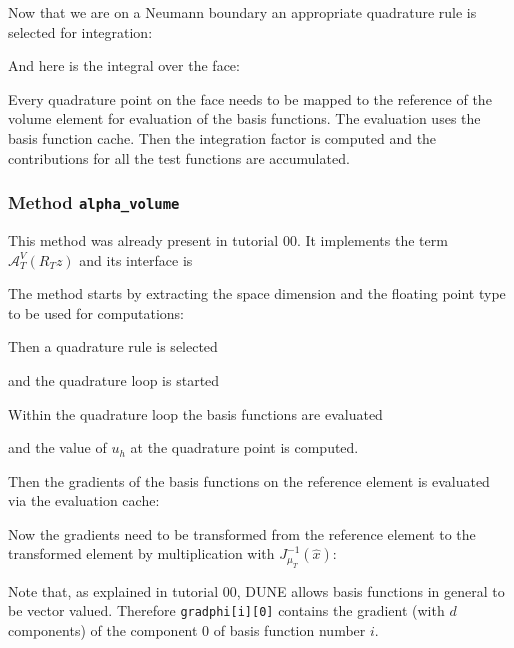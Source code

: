 \documentclass[a4paper,12pt]{article}
\begin{document}
Now that we are on a Neumann boundary an appropriate quadrature rule
is selected for integration:


And here is the integral over the face:

Every quadrature point on the face needs to be mapped to the reference
of the volume element for evaluation of the basis functions.
The evaluation uses the basis function cache. Then the integration
factor is computed and the contributions for all the test functions
are accumulated.

\subsubsection*{Method \lstinline{alpha_volume}}

This method was already present in tutorial 00.
It implements the term $\mathcal{A}_T^V(R_T z)$ and its interface is


The method starts by extracting the space dimension and
the floating point type to be used for computations:


Then a quadrature rule is selected

and the quadrature loop is started


Within the quadrature loop the basis functions are evaluated

and the value of $u_h$ at the quadrature point is computed.

Then the gradients of the basis functions on the reference element is evaluated
via the evaluation cache:

Now the gradients need to be transformed from the reference element
to the transformed element by multiplication with $J_{\mu_T}^{-1}(\hat x)$:

Note that, as explained in tutorial 00, DUNE allows basis functions
in general to be vector valued. Therefore \lstinline{gradphi[i][0]} contains
the gradient (with $d$ components) of the component 0 of basis function number $i$.
\end{document}
